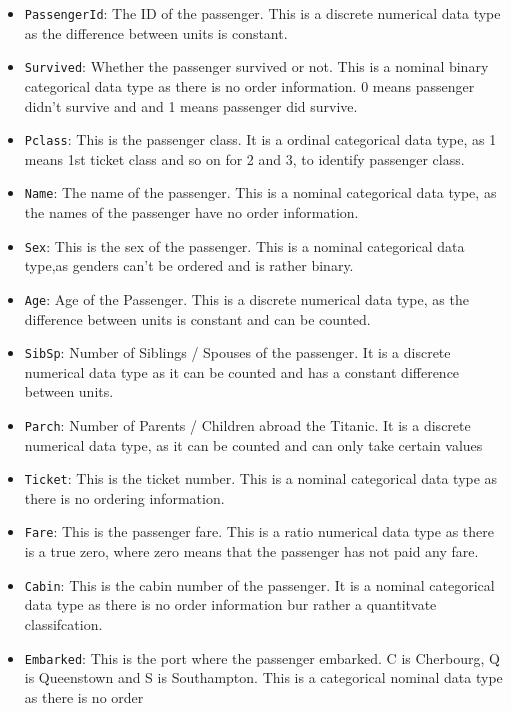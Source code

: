\documentclass[a4paper, twocolumn]{article}
\begin{document}
\begin{itemize}
    \item \texttt{PassengerId}: The ID of the passenger. This is
    a discrete numerical data type as the difference between units 
    is constant.
    \item \texttt{Survived}: Whether the passenger survived or not. 
    This is a nominal binary categorical data type as there is no 
    order information. 0 means passenger didn't survive and and 1
    means passenger did survive.
    \item \texttt{Pclass}: This is the passenger class. It is a 
    ordinal categorical data type, as 1 means 1st ticket class and 
    so on for 2 and 3, to identify passenger class.
    \item \texttt{Name}: The name of the passenger. This is a 
    nominal categorical data type, as the names of the passenger 
    have no order information.
    \item \texttt{Sex}: This is the sex of the passenger. 
    This is a nominal categorical data type,as genders can't be 
    ordered and is rather binary.
    \item \texttt{Age}: Age of the Passenger. This is a discrete 
    numerical data type, as the difference between units is 
    constant and can be counted.
    \item \texttt{SibSp}: Number of Siblings / Spouses of the
    passenger. It is a discrete numerical data type as it can be 
    counted and has a constant difference between units.
    \item \texttt{Parch}: Number of Parents / Children abroad the 
    Titanic. It is a discrete numerical data type, as it can be 
    counted and can only take certain values
    \item \texttt{Ticket}: This is the ticket number. This is a 
    nominal categorical data type as there is no ordering 
    information.
    \item \texttt{Fare}: This is the passenger fare. This is a ratio
    numerical data type as there is a true zero, where zero means
    that the passenger has not paid any fare.
    \item \texttt{Cabin}: This is the cabin number of the passenger.
    It is a nominal categorical data type as there is no order
    information bur rather a quantitvate classifcation.
    \item \texttt{Embarked}: This is the port where the passenger
    embarked. C is Cherbourg, Q is Queenstown and S is Southampton.
    This is a categorical nominal data type as there is no order

\end{itemize}
\end{document}
